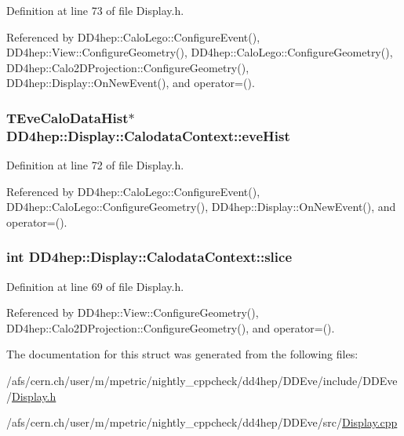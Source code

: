 Definition at line 73 of file Display.h.

Referenced by DD4hep::CaloLego::ConfigureEvent(), DD4hep::View::ConfigureGeometry(), DD4hep::CaloLego::ConfigureGeometry(), DD4hep::Calo2DProjection::ConfigureGeometry(), DD4hep::Display::OnNewEvent(), and operator=().\hypertarget{struct_d_d4hep_1_1_display_1_1_calodata_context_a55f5826e26bf9f967abeb22cd1f507d7}{
\subsubsection[{eveHist}]{\setlength{\rightskip}{0pt plus 5cm}TEveCaloDataHist$\ast$ {\bf DD4hep::Display::CalodataContext::eveHist}}}
\label{struct_d_d4hep_1_1_display_1_1_calodata_context_a55f5826e26bf9f967abeb22cd1f507d7}


Definition at line 72 of file Display.h.

Referenced by DD4hep::CaloLego::ConfigureEvent(), DD4hep::CaloLego::ConfigureGeometry(), DD4hep::Display::OnNewEvent(), and operator=().\hypertarget{struct_d_d4hep_1_1_display_1_1_calodata_context_a7a289d192f903d7fd62f5db2b6631eea}{
\subsubsection[{slice}]{\setlength{\rightskip}{0pt plus 5cm}int {\bf DD4hep::Display::CalodataContext::slice}}}
\label{struct_d_d4hep_1_1_display_1_1_calodata_context_a7a289d192f903d7fd62f5db2b6631eea}


Definition at line 69 of file Display.h.

Referenced by DD4hep::View::ConfigureGeometry(), DD4hep::Calo2DProjection::ConfigureGeometry(), and operator=().

The documentation for this struct was generated from the following files:\begin{DoxyCompactItemize}
\item 
/afs/cern.ch/user/m/mpetric/nightly\_\-cppcheck/dd4hep/DDEve/include/DDEve/\hyperlink{_display_8h}{Display.h}\item 
/afs/cern.ch/user/m/mpetric/nightly\_\-cppcheck/dd4hep/DDEve/src/\hyperlink{_display_8cpp}{Display.cpp}\end{DoxyCompactItemize}
